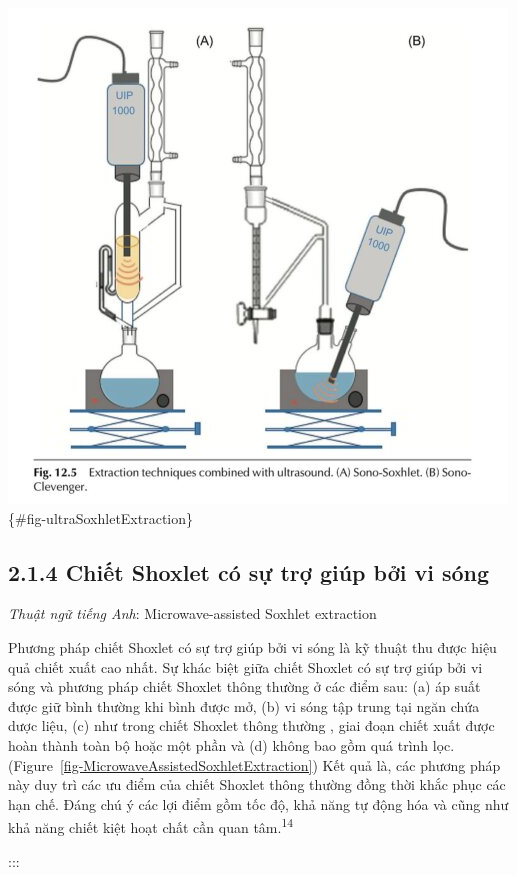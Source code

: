\documentclass[
  twocolumn,
  landscape]{report}
\begin{document}
\includegraphics{../graphics/ultrasonic-soxhlet-extraction.png}
\{\#fig-ultraSoxhletExtraction\}

\subsection{2.1.4 Chiết Shoxlet có sự trợ giúp bởi vi
sóng}\label{chiux1ebft-shoxlet-cuxf3-sux1ef1-trux1ee3-giuxfap-bux1edfi-vi-suxf3ng}

\emph{Thuật ngữ tiếng Anh}: Microwave-assisted Soxhlet extraction

Phương pháp chiết Shoxlet có sự trợ giúp bởi vi sóng là kỹ thuật thu
được hiệu quả chiết xuất cao nhất. Sự khác biệt giữa chiết Shoxlet có sự
trợ giúp bởi vi sóng và phương pháp chiết Shoxlet thông thường ở các
điểm sau: (a) áp suất được giữ bình thường khi bình được mở, (b) vi sóng
tập trung tại ngăn chứa dược liệu, (c) như trong chiết Shoxlet thông
thường , giai đoạn chiết xuất được hoàn thành toàn bộ hoặc một phần và
(d) không bao gồm quá trình lọc.
(Figure~\ref{fig-MicrowaveAssistedSoxhletExtraction}) Kết quả là, các
phương pháp này duy trì các ưu điểm của chiết Shoxlet thông thường đồng
thời khắc phục các hạn chế. Đáng chú ý các lợi điểm gồm tốc độ, khả năng
tự động hóa và cũng như khả năng chiết kiệt hoạt chất cần quan
tâm.\textsuperscript{14}

:::
\end{document}
